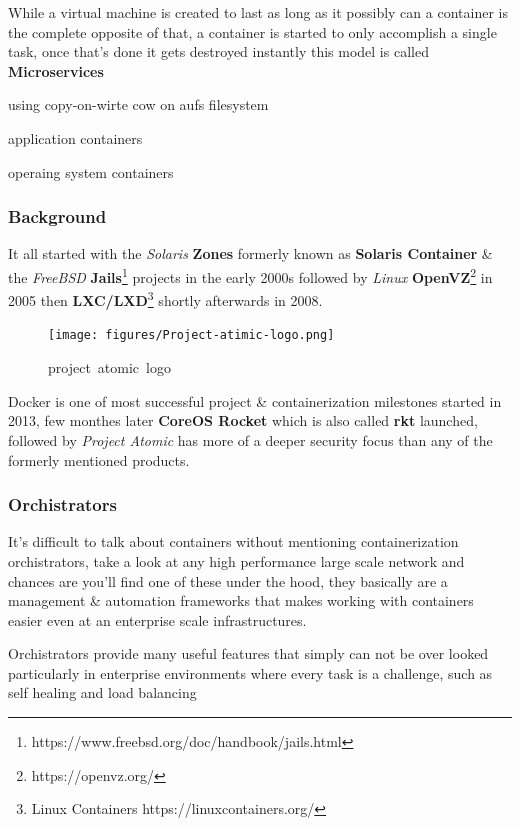 \documentclass[
  14pt,
  english,
  a4paper,
]{scrreprt}
\begin{document}
While a virtual machine is created to last as long as it possibly can a
container is the complete opposite of that, a container is started to
only accomplish a single task, once that's done it gets destroyed
instantly this model is called \textbf{Microservices}

using copy-on-wirte cow on aufs filesystem

application containers

operaing system containers

\hypertarget{background-2}{%
\subsubsection{Background}\label{background-2}}

It all started with the \emph{Solaris} \textbf{Zones} formerly known as
\textbf{Solaris Container} \& the \emph{FreeBSD}
\textbf{Jails}\footnote{https://www.freebsd.org/doc/handbook/jails.html}
projects in the early 2000s followed by \emph{Linux}
\textbf{OpenVZ}\footnote{https://openvz.org/} in 2005 then
\textbf{LXC/LXD}\footnote{Linux Containers https://linuxcontainers.org/}
shortly afterwards in 2008.

\begin{figure}
\centering
\texttt{[image: figures/Project-atimic-logo.png]}
\caption{project~atomic~logo}
\end{figure}

Docker is one of most successful project \& containerization milestones
started in 2013, few monthes later \textbf{CoreOS Rocket} which is also
called \textbf{rkt} launched, followed by \emph{Project Atomic} has more
of a deeper security focus than any of the formerly mentioned products.

\hypertarget{orchistrators}{%
\subsubsection{Orchistrators}\label{orchistrators}}

It's difficult to talk about containers without mentioning
containerization orchistrators, take a look at any high performance
large scale network and chances are you'll find one of these under the
hood, they basically are a management \& automation frameworks that
makes working with containers easier even at an enterprise scale
infrastructures.

Orchistrators provide many useful features that simply can not be over
looked particularly in enterprise environments where every task is a
challenge, such as self healing and load balancing
\end{document}
